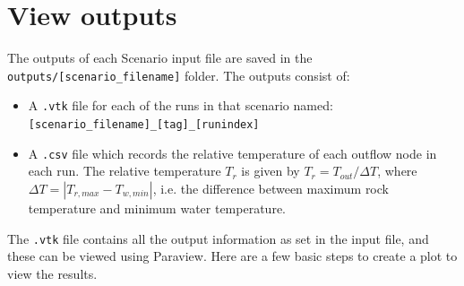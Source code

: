 \section{View outputs}
\label{sec:view outputs}
The outputs of each Scenario input file are saved in the \texttt{outputs/[scenario\_filename]} folder.  
The outputs consist of:
\begin{itemize}
\item A {\tt .vtk} file for each of the runs in that scenario named: \texttt{[scenario\_filename]\_[tag]\_[runindex]}
\item A {\tt .csv} file which records the relative temperature of each outflow node in each run. The relative temperature $T_r$ is given by $T_r = T_{out}/\Delta T$, where $\Delta T = |T_{r,max} - T_{w,min}|$, i.e. the difference between maximum rock temperature and minimum water temperature. 
\end{itemize}
The {\tt .vtk} file contains all the output information as set in the input file, and these can be viewed using Paraview. Here are a few basic steps to create a plot to view the results. 
